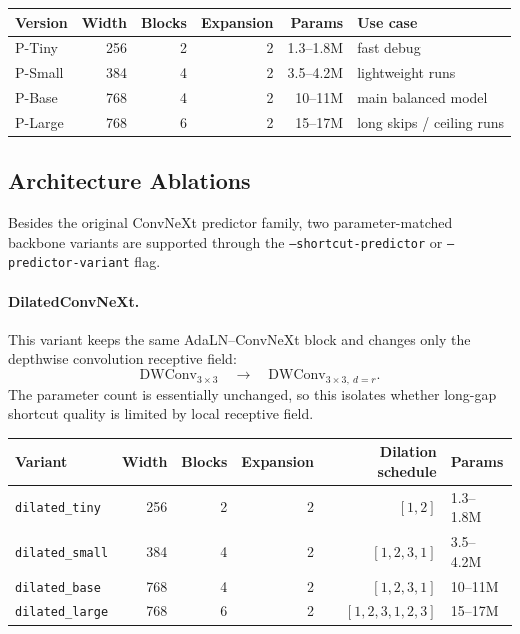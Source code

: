 \documentclass[11pt]{article}
\begin{document}
\begin{center}
\begin{tabular}{lrrrrl}
\toprule
Version & Width & Blocks & Expansion & Params & Use case \\
\midrule
P-Tiny  & 256 & 2 & 2 & 1.3--1.8M & fast debug \\
P-Small & 384 & 4 & 2 & 3.5--4.2M & lightweight runs \\
P-Base  & 768 & 4 & 2 & 10--11M & main balanced model \\
P-Large & 768 & 6 & 2 & 15--17M & long skips / ceiling runs \\
\bottomrule
\end{tabular}
\end{center}

\subsection{Architecture Ablations}
Besides the original ConvNeXt predictor family, two parameter-matched
backbone variants are supported through the \texttt{--shortcut-predictor}
or \texttt{--predictor-variant} flag.

\paragraph{DilatedConvNeXt.}
This variant keeps the same AdaLN--ConvNeXt block and changes only the
depthwise convolution receptive field:
\[
    \mathrm{DWConv}_{3\times3}
    \quad\rightarrow\quad
    \mathrm{DWConv}_{3\times3,\ d=r}.
\]
The parameter count is essentially unchanged, so this isolates whether
long-gap shortcut quality is limited by local receptive field.

\begin{center}
\begin{tabular}{lrrrrl}
\toprule
Variant & Width & Blocks & Expansion & Dilation schedule & Params \\
\midrule
\texttt{dilated\_tiny}  & 256 & 2 & 2 & $[1,2]$ & 1.3--1.8M \\
\texttt{dilated\_small} & 384 & 4 & 2 & $[1,2,3,1]$ & 3.5--4.2M \\
\texttt{dilated\_base}  & 768 & 4 & 2 & $[1,2,3,1]$ & 10--11M \\
\texttt{dilated\_large} & 768 & 6 & 2 & $[1,2,3,1,2,3]$ & 15--17M \\
\bottomrule
\end{tabular}
\end{center}
\end{document}
